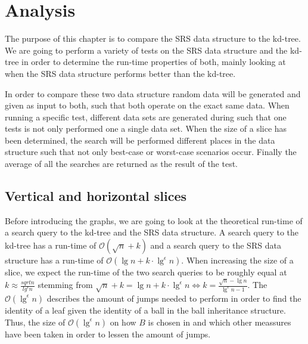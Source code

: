 \chapter{Analysis}
The purpose of this chapter is to compare the SRS data structure to the kd-tree. We are going to perform a variety of tests on the SRS data structure and the kd-tree in order to determine the run-time properties of both, mainly looking at when the SRS data structure performs better than the kd-tree.


In order to compare these two data structure random data will be generated and given as input to both, such that both operate on the exact same data. When running a specific test, different data sets are generated during such that one tests is not only performed one a single data set. When the size of a slice has been determined, the search will be performed different places in the data structure such that not only best-case or worst-case scenarios occur. Finally the average of all the searches are returned as the result of the test.


\section{Vertical and horizontal slices}

Before introducing the graphs, we are going to look at the theoretical run-time of a search query to the kd-tree and the SRS data structure. A search query to the kd-tree has a run-time of $\mathcal{O}(\sqrt{n}+k)$ and a search query to the SRS data structure has a run-time of $\mathcal{O}(\lg n + k \cdot \lg^\epsilon n)$. When increasing the size of a slice, we expect the run-time of the two search queries to be roughly equal at $k \approx \frac{sqrt{n}}{lg^\epsilon n}$ stemming from $\sqrt{n} + k = \lg n + k \cdot \lg^\epsilon n \Leftrightarrow k = \frac{\sqrt{n} - \lg n}{\lg^\epsilon n - 1}$. The $\mathcal{O}(\lg^\epsilon n)$ describes the amount of jumps needed to perform in order to find the identity of a leaf given the identity of a ball in the ball inheritance structure. Thus, the size of $\mathcal{O}(\lg^\epsilon n)$ on how $B$ is chosen in  and which other meassures have been taken in order to lessen the amount of jumps. 

